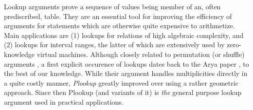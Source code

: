 \documentclass[11pt]{article}
\theoremstyle{definition}
\theoremstyle{definition}
\begin{document}
Lookup arguments prove a sequence of values being member of an, often prediscribed, table.
They are an essential tool for improving the efficiency of arguments for statements which are otherwise quite expensive to arithmetize. 
Main applications are (1) lookups for relations of high algebraic complexity, and (2) lookups for interval ranges, the latter of which are extensively used by zero-knowledge virtual machines.
Although closely related to permutation (or shuffle) arguments \cite{shuffle}, a first explicit occurence of lookups dates back to the  Arya paper \cite{Arya}, to the best of our knowledge.
While their argument handles multiplicities directly in a quite costly manner, \textit{Plookup} \cite{Plookup} greatly improved over \cite{Arya} using a rather geometric approach.
Since then Plookup (and variants of it) is \textit{the} general purpose lookup argument used in practical applications. 
\end{document}
